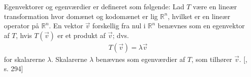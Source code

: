 
Egenvektorer og egenværdier er defineret som følgende: Lad $T$ være en lineær transformation hvor domænet og kodomænet er lig $\mathbb{R}^n$, hvilket er en lineær operator på $\mathbb{R}^n$. En vektor $\vec{v}$ forskellig fra nul i $\mathbb{R}^n$ benævnes som en egenvektor af $T$, hvis $T(\vec{v})$ er et produkt af $\vec{v}$; dvs.
\begin{align}
T(\vec{v})=\lambda\vec{v}
\end{align}
for skalarerne $\lambda$. Skalarerne $\lambda$ benævnes som egenværdier af $T$, som tilhører $\vec{v}$. [\citet{linalg}, s. 294]

